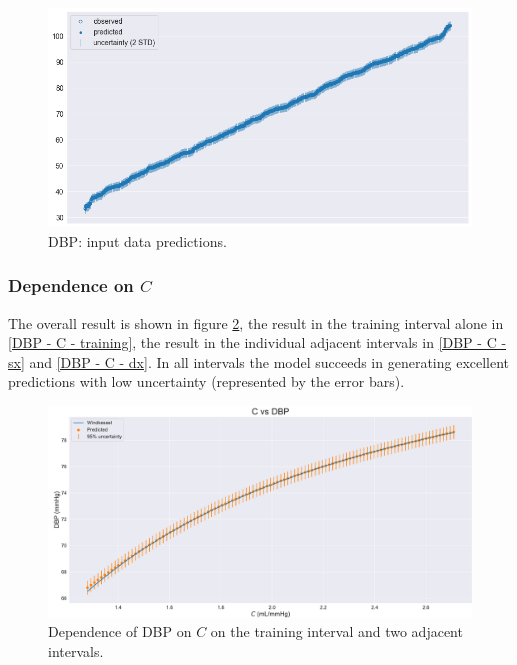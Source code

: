 \begin{figure}[h]
    \centering
    \includegraphics[width=1\textwidth]{images/Training (risultati)/DBP/DBP - inference.png}
    \caption{DBP: input data predictions.}
    \label{DBP - inference}
\end{figure}



\subsubsection{Dependence on $C$}
The overall result is shown in figure \ref{DBP - C - full}, the result in the training interval alone in \ref{DBP - C - training}, the result in the individual adjacent intervals in \ref{DBP - C - sx} and \ref{DBP - C - dx}. In all intervals the model succeeds in generating excellent predictions with low uncertainty (represented by the error bars).

\vspace{1cm}

\begin{figure}[!htb]
    \centering
    \includegraphics[width=1\textwidth]{images/Training (risultati)/DBP/DBP - C - full.pdf}
    \caption{Dependence of DBP on $C$ on the training interval and two adjacent intervals.}
    \label{DBP - C - full}
\end{figure}

